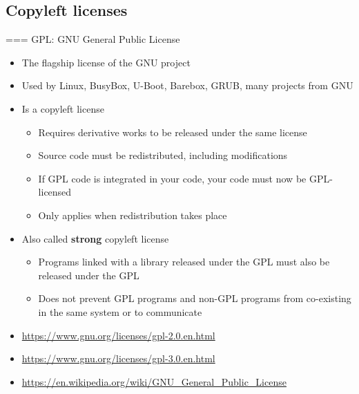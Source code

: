 \subsection{Copyleft licenses}

=== {GPL: GNU General Public License}
  \begin{itemize}
  \item The flagship license of the GNU project
  \item Used by Linux, BusyBox, U-Boot, Barebox, GRUB, many projects from GNU
  \item Is a copyleft license
    \begin{itemize}
    \item Requires derivative works to be released under the same
      license
    \item Source code must be redistributed, including modifications
    \item If GPL code is integrated in your code, your code must now
      be GPL-licensed
    \item Only applies when redistribution takes place
    \end{itemize}
  \item Also called {\bf strong} copyleft license
    \begin{itemize}
    \item Programs linked with a library released under the GPL must
      also be released under the GPL
    \item Does not prevent GPL programs and non-GPL programs from
      co-existing in the same system or to communicate
    \end{itemize}
  \item \url{https://www.gnu.org/licenses/gpl-2.0.en.html}
  \item \url{https://www.gnu.org/licenses/gpl-3.0.en.html}
  \item \url{https://en.wikipedia.org/wiki/GNU_General_Public_License}
  \end{itemize}


